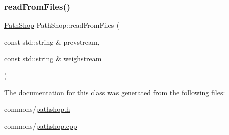 \mbox{\label{class_path_shop_a23fbe546bb0990d64c1f5c08d6432426}} 
\subsubsection{\texorpdfstring{readFromFiles()}{readFromFiles()}}
{\footnotesize\ttfamily \mbox{\hyperlink{class_path_shop}{Path\+Shop}} Path\+Shop\+::read\+From\+Files (\begin{DoxyParamCaption}\item[{const std\+::string \&}]{prevstream,  }\item[{const std\+::string \&}]{weighstream }\end{DoxyParamCaption})\hspace{0.3cm}{\ttfamily [static]}}



The documentation for this class was generated from the following files\+:\begin{DoxyCompactItemize}
\item 
commons/\mbox{\hyperlink{pathshop_8h}{pathshop.\+h}}\item 
commons/\mbox{\hyperlink{pathshop_8cpp}{pathshop.\+cpp}}\end{DoxyCompactItemize}

